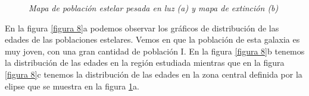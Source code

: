 \documentclass{article}
\begin{document}
\begin{figure}[H]
	\centering
	\caption{\emph{Mapa de población estelar pesada en luz (a) y mapa de extinción (b)}}
	\label{figura 7}
\end{figure} 
En la figura \ref{figura 8}a podemos observar los gráficos de distribución de las edades de las poblaciones estelares. Vemos en que la población de esta galaxia es muy joven, con una gran cantidad de población I. En la figura \ref{figura 8}b tenemos la distribución de las edades en la región estudiada mientras que en la figura \ref{figura 8}c tenemos la distribución de las edades en la zona central definida por la elipse que se muestra en la figura \ref{figura 7}a.
\end{document}
